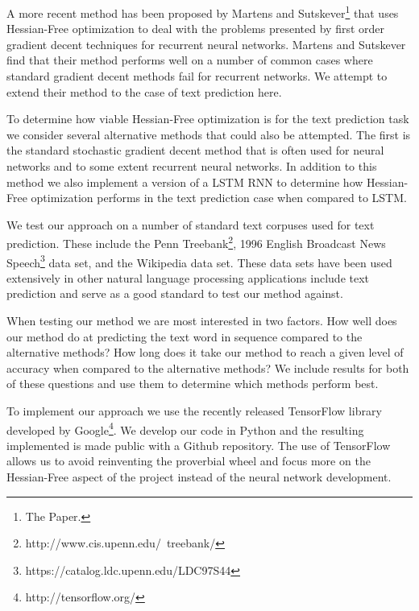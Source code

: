 \documentclass{article}
\begin{document}
A more recent method has been proposed by Martens and Sutskever\footnote{The Paper.} that uses Hessian-Free optimization to deal with the problems presented by first order gradient decent techniques for recurrent neural networks.  Martens and Sutskever find that their method performs well on a number of common cases where standard gradient decent methods fail for recurrent networks.  We attempt to extend their method to the case of text prediction here.

To determine how viable Hessian-Free optimization is for the text prediction task we consider several alternative methods that could also be attempted.  The first is the standard stochastic gradient decent method that is often used for neural networks and to some extent recurrent neural networks.  In addition to this method we also implement a version of a LSTM RNN to determine how Hessian-Free optimization performs in the text prediction case when compared to LSTM.

We test our approach on a number of standard text corpuses used for text prediction.  These include the Penn Treebank\footnote{http://www.cis.upenn.edu/~treebank/}, 1996 English Broadcast News Speech\footnote{https://catalog.ldc.upenn.edu/LDC97S44} data set, and the Wikipedia data set.  These data sets have been used extensively in other natural language processing applications include text prediction and serve as a good standard to test our method against.

When testing our method we are most interested in two factors.  How well does our method do at predicting the text word in sequence compared to the alternative methods?  How long does it take our method to reach a given level of accuracy when compared to the alternative methods?  We include results for both of these questions and use them to determine which methods perform best.

To implement our approach we use the recently released TensorFlow library developed by Google\footnote{http://tensorflow.org/}.  We develop our code in Python and the resulting implemented is made public with a Github repository.  The use of TensorFlow allows us to avoid reinventing the proverbial wheel and focus more on the Hessian-Free aspect of the project instead of the neural network development.
\end{document}
